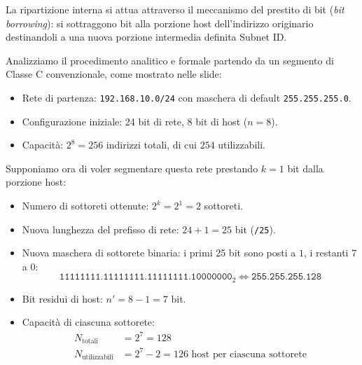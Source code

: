 \documentclass[11pt, a4paper]{article}
\begin{document}

La ripartizione interna si attua attraverso il meccanismo del prestito di bit (\emph{bit borrowing}): si sottraggono bit alla porzione host dell'indirizzo originario destinandoli a una nuova porzione intermedia definita Subnet ID.

Analizziamo il procedimento analitico e formale partendo da un segmento di Classe C convenzionale, come mostrato nelle slide:
\begin{itemize}
    \item Rete di partenza: \texttt{192.168.10.0/24} con maschera di default \texttt{255.255.255.0}.
    \item Configurazione iniziale: 24 bit di rete, 8 bit di host ($n = 8$).
    \item Capacità: $2^8 = 256$ indirizzi totali, di cui $254$ utilizzabili.
\end{itemize}


Supponiamo ora di voler segmentare questa rete prestando $k = 1$ bit dalla porzione host:
\begin{itemize}
    \item Numero di sottoreti ottenute: $2^k = 2^1 = 2$ sottoreti.
    \item Nuova lunghezza del prefisso di rete: $24 + 1 = 25$ bit (\texttt{/25}).
    \item Nuova maschera di sottorete binaria: i primi 25 bit sono posti a $1$, i restanti 7 a $0$:
    \[
    \texttt{11111111.11111111.11111111.10000000}_2 \iff \texttt{255.255.255.128}
    \]
    \item Bit residui di host: $n' = 8 - 1 = 7$ bit.
    \item Capacità di ciascuna sottorete:
    \begin{align*}
    N_{\text{totali}} &= 2^7 = 128 \\
    N_{\text{utilizzabili}} &= 2^7 - 2 = 126 \text{ host per ciascuna sottorete}
    \end{align*}
\end{itemize}

\end{document}
